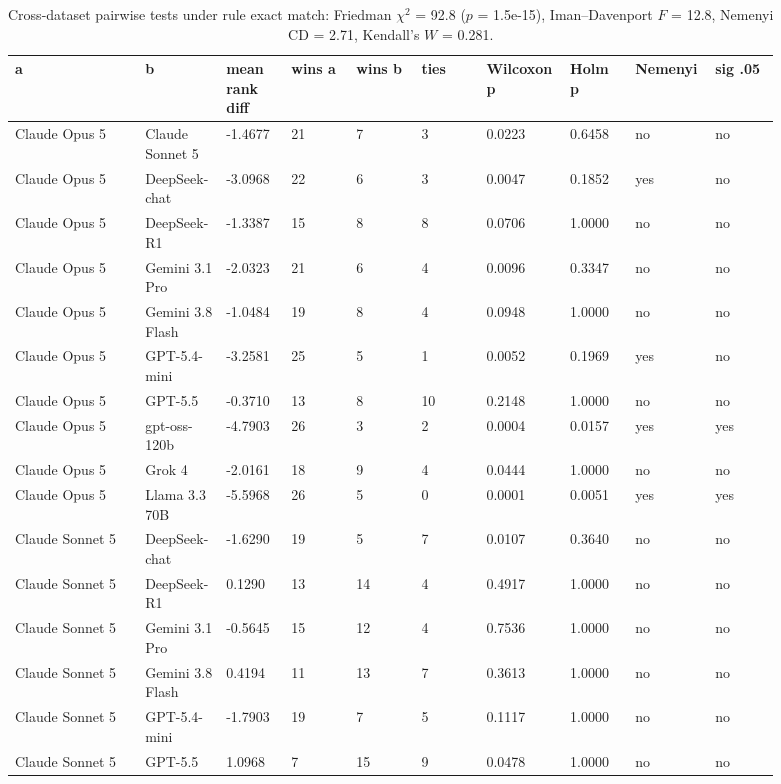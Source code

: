 \begin{landscape}
\tiny
\setlength{\tabcolsep}{3pt}
\begin{longtable}{p{0.162\linewidth}p{0.081\linewidth}p{0.081\linewidth}p{0.081\linewidth}p{0.081\linewidth}p{0.081\linewidth}p{0.081\linewidth}p{0.081\linewidth}p{0.081\linewidth}p{0.081\linewidth}}
\caption{Cross-dataset pairwise tests under rule exact match: Friedman $\chi^2$ = 92.8 ($p$ = 1.5e-15), Iman--Davenport $F$ = 12.8, Nemenyi CD = 2.71, Kendall's $W$ = 0.281.}\label{tab:pairwise_em_only}\\
\toprule
a & b & mean rank diff & wins a & wins b & ties & Wilcoxon p & Holm p & Nemenyi & sig .05 \\
\midrule
Claude Opus 5 & Claude Sonnet 5 & -1.4677 & 21 & 7 & 3 & 0.0223 & 0.6458 & no & no \\
Claude Opus 5 & DeepSeek-chat & -3.0968 & 22 & 6 & 3 & 0.0047 & 0.1852 & yes & no \\
Claude Opus 5 & DeepSeek-R1 & -1.3387 & 15 & 8 & 8 & 0.0706 & 1.0000 & no & no \\
Claude Opus 5 & Gemini 3.1 Pro & -2.0323 & 21 & 6 & 4 & 0.0096 & 0.3347 & no & no \\
Claude Opus 5 & Gemini 3.8 Flash & -1.0484 & 19 & 8 & 4 & 0.0948 & 1.0000 & no & no \\
Claude Opus 5 & GPT-5.4-mini & -3.2581 & 25 & 5 & 1 & 0.0052 & 0.1969 & yes & no \\
Claude Opus 5 & GPT-5.5 & -0.3710 & 13 & 8 & 10 & 0.2148 & 1.0000 & no & no \\
Claude Opus 5 & gpt-oss-120b & -4.7903 & 26 & 3 & 2 & 0.0004 & 0.0157 & yes & yes \\
Claude Opus 5 & Grok 4 & -2.0161 & 18 & 9 & 4 & 0.0444 & 1.0000 & no & no \\
Claude Opus 5 & Llama 3.3 70B & -5.5968 & 26 & 5 & 0 & 0.0001 & 0.0051 & yes & yes \\
Claude Sonnet 5 & DeepSeek-chat & -1.6290 & 19 & 5 & 7 & 0.0107 & 0.3640 & no & no \\
Claude Sonnet 5 & DeepSeek-R1 & 0.1290 & 13 & 14 & 4 & 0.4917 & 1.0000 & no & no \\
Claude Sonnet 5 & Gemini 3.1 Pro & -0.5645 & 15 & 12 & 4 & 0.7536 & 1.0000 & no & no \\
Claude Sonnet 5 & Gemini 3.8 Flash & 0.4194 & 11 & 13 & 7 & 0.3613 & 1.0000 & no & no \\
Claude Sonnet 5 & GPT-5.4-mini & -1.7903 & 19 & 7 & 5 & 0.1117 & 1.0000 & no & no \\
Claude Sonnet 5 & GPT-5.5 & 1.0968 & 7 & 15 & 9 & 0.0478 & 1.0000 & no & no \\

\end{longtable}
\end{landscape}
